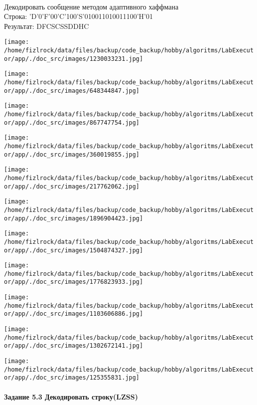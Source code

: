 \documentclass[a4paper, 12pt]{article}
\begin{document}
\\ 

Декодировать сообщение методом адаптивного хаффмана \\
Строка: 
'D'0'F'00'C'100'S'010011010011100'H'01\\
Результат: DFCSCSSDDHC

\texttt{[image: /home/fizlrock/data/files/backup/code\_backup/hobby/algoritms/LabExecutor/app/./doc\_src/images/1230033231.jpg]}

\texttt{[image: /home/fizlrock/data/files/backup/code\_backup/hobby/algoritms/LabExecutor/app/./doc\_src/images/648344847.jpg]}

\texttt{[image: /home/fizlrock/data/files/backup/code\_backup/hobby/algoritms/LabExecutor/app/./doc\_src/images/867747754.jpg]}

\texttt{[image: /home/fizlrock/data/files/backup/code\_backup/hobby/algoritms/LabExecutor/app/./doc\_src/images/360019855.jpg]}

\texttt{[image: /home/fizlrock/data/files/backup/code\_backup/hobby/algoritms/LabExecutor/app/./doc\_src/images/217762062.jpg]}

\texttt{[image: /home/fizlrock/data/files/backup/code\_backup/hobby/algoritms/LabExecutor/app/./doc\_src/images/1896904423.jpg]}

\texttt{[image: /home/fizlrock/data/files/backup/code\_backup/hobby/algoritms/LabExecutor/app/./doc\_src/images/1504874327.jpg]}

\texttt{[image: /home/fizlrock/data/files/backup/code\_backup/hobby/algoritms/LabExecutor/app/./doc\_src/images/1776823933.jpg]}

\texttt{[image: /home/fizlrock/data/files/backup/code\_backup/hobby/algoritms/LabExecutor/app/./doc\_src/images/1103606886.jpg]}

\texttt{[image: /home/fizlrock/data/files/backup/code\_backup/hobby/algoritms/LabExecutor/app/./doc\_src/images/1302672141.jpg]}

\texttt{[image: /home/fizlrock/data/files/backup/code\_backup/hobby/algoritms/LabExecutor/app/./doc\_src/images/125355831.jpg]}
\pagebreak
\paragraph{Задание 5.3 Декодировать строку(LZSS)\\}
\end{document}
